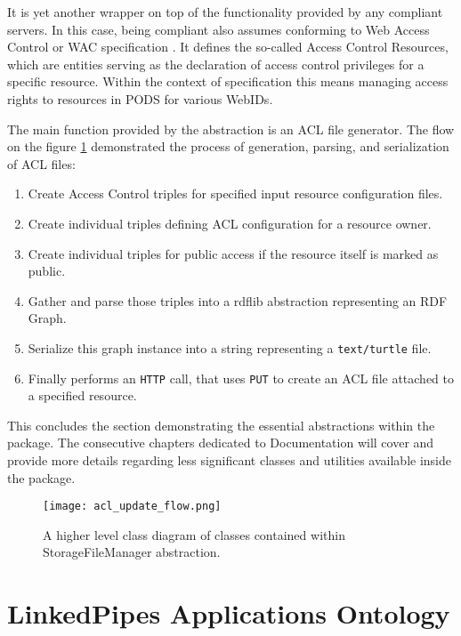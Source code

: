 It is yet another wrapper on top of the functionality provided by any \solid{} compliant servers. In this case, being \solid{} compliant also assumes conforming to Web Access Control or WAC specification \cite{Solid:WAC}. It defines the so-called Access Control Resources, which are entities serving as the declaration of access control privileges for a specific resource. Within the context of \solid{} specification this means managing access rights to resources in \solid{} PODS for various WebIDs.

The main function provided by the abstraction is an ACL file generator. The flow on the figure \ref{fig:lps_acl_update_flow} demonstrated the process of generation, parsing, and serialization of ACL files: 

\begin{enumerate}
    \item Create Access Control triples for specified input resource configuration files.
    \item Create individual triples defining ACL configuration for a resource owner.
    \item Create individual triples for public access if the resource itself is marked as public.
    \item Gather and parse those triples into a rdflib abstraction representing an RDF Graph.
    \item Serialize this graph instance into a string representing a \texttt{text/turtle} file.
    \item Finally performs an \texttt{HTTP} call, that uses \texttt{PUT} to create an ACL file attached to a specified resource.
\end{enumerate}

This concludes the section demonstrating the essential abstractions within the \lpas{} package. The consecutive chapters dedicated to Documentation will cover and provide more details regarding less significant classes and utilities available inside the package.

\begin{figure}[h]
\centering
\texttt{[image: acl\_update\_flow.png]}
\caption{A higher level class diagram of classes contained within StorageFileManager abstraction.}
\label{fig:lps_acl_update_flow}
\end{figure}


\section{LinkedPipes Applications Ontology}
\label{ssec:lpas_application_ontology_arch}

